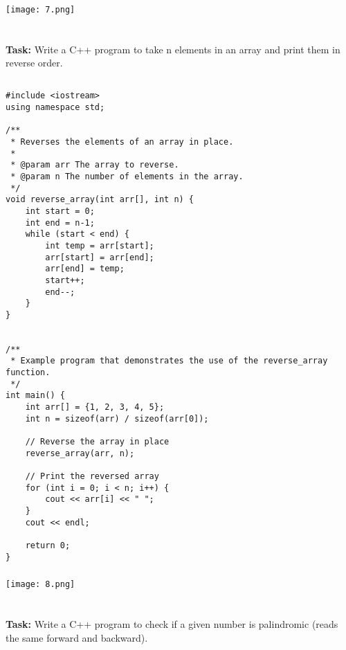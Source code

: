 \documentclass[12pt,a4paper]{article}
\begin{document}
\subsubsection{}
\begin{center}
    \texttt{[image: 7.png]}
\end{center}


\section{}
\textbf{Task:} Write a C++ program to take n elements in an array and print them in reverse order.

\subsection{}
\begin{lstlisting}
#include <iostream>
using namespace std;

/**
 * Reverses the elements of an array in place.
 *
 * @param arr The array to reverse.
 * @param n The number of elements in the array.
 */
void reverse_array(int arr[], int n) {
    int start = 0;
    int end = n-1;
    while (start < end) {
        int temp = arr[start];
        arr[start] = arr[end];
        arr[end] = temp;
        start++;
        end--;
    }
}


/**
 * Example program that demonstrates the use of the reverse_array function.
 */
int main() {
    int arr[] = {1, 2, 3, 4, 5};
    int n = sizeof(arr) / sizeof(arr[0]);

    // Reverse the array in place
    reverse_array(arr, n);

    // Print the reversed array
    for (int i = 0; i < n; i++) {
        cout << arr[i] << " ";
    }
    cout << endl;

    return 0;
}
\end{lstlisting}

\subsubsection{}
\begin{center}
    \texttt{[image: 8.png]}
\end{center}


\section{}
\textbf{Task:} Write a C++ program to check if a given number is palindromic (reads the same forward and backward).
\end{document}
